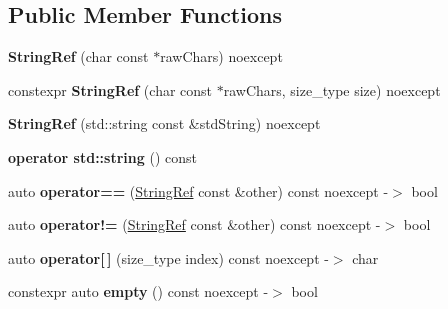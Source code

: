 \subsection*{Public Member Functions}
\begin{DoxyCompactItemize}
\item 
\mbox{\label{classCatch_1_1StringRef_aea45f5089c53adac362bff6bd7c40943}} 
{\bfseries String\+Ref} (char const $\ast$raw\+Chars) noexcept
\item 
\mbox{\label{classCatch_1_1StringRef_a36df94807491c0ad84184fb8e44e1a7c}} 
constexpr {\bfseries String\+Ref} (char const $\ast$raw\+Chars, size\+\_\+type size) noexcept
\item 
\mbox{\label{classCatch_1_1StringRef_a7fe41469048f906e9a847798cd335f23}} 
{\bfseries String\+Ref} (std\+::string const \&std\+String) noexcept
\item 
\mbox{\label{classCatch_1_1StringRef_ad9fde21785affacc32d7da7a70d74e93}} 
{\bfseries operator std\+::string} () const
\item 
\mbox{\label{classCatch_1_1StringRef_aabb30149ab961187e4b3ff3394bf6e73}} 
auto {\bfseries operator==} (\hyperlink{classCatch_1_1StringRef}{String\+Ref} const \&other) const noexcept -\/$>$ bool
\item 
\mbox{\label{classCatch_1_1StringRef_aaa6c8bf61c4628034c19763d1c8ad215}} 
auto {\bfseries operator!=} (\hyperlink{classCatch_1_1StringRef}{String\+Ref} const \&other) const noexcept -\/$>$ bool
\item 
\mbox{\label{classCatch_1_1StringRef_a4ba2e01eec1f0f56c257d213c796ab3b}} 
auto {\bfseries operator\mbox{[}$\,$\mbox{]}} (size\+\_\+type index) const noexcept -\/$>$ char
\item 
\mbox{\label{classCatch_1_1StringRef_a0b4841c28cbb14ba07296964a0187023}} 
constexpr auto {\bfseries empty} () const noexcept -\/$>$ bool
\item 
\mbox{\label{classCatch_1_1StringRef_acb22719801de2b64361b4c283080d4e5}} 

\end{DoxyCompactItemize}
